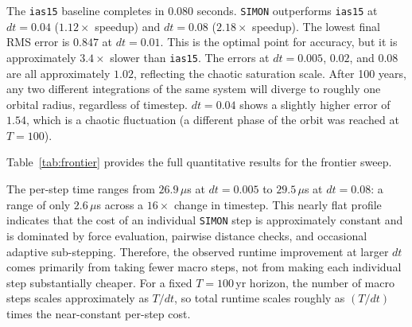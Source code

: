 \documentclass[12pt]{article}
\begin{document}
The \texttt{ias15} baseline completes in $0.080$ seconds. \texttt{SIMON} outperforms
\texttt{ias15} at $dt = 0.04$ ($1.12\times$ speedup) and $dt = 0.08$ ($2.18\times$
speedup). The lowest final RMS error is $0.847$ at $dt = 0.01$. This is the optimal
point for accuracy, but it is approximately $3.4\times$ slower than \texttt{ias15}.
The errors at $dt = 0.005$, $0.02$, and $0.08$ are all approximately $1.02$,
reflecting the chaotic saturation scale. After 100 years, any two different integrations
of the same system will diverge to roughly one orbital radius, regardless of timestep.
$dt = 0.04$ shows a slightly higher error of $1.54$, which is a chaotic fluctuation
(a different phase of the orbit was reached at $T = 100$).

Table~\ref{tab:frontier} provides the full quantitative results for the frontier sweep.

\begin{table}[H]
\centering
\caption{Speed-accuracy frontier results for \texttt{SIMON} with adaptive
sub-stepping, $T = 100$\,yr. \texttt{ias15} baseline: $0.080$\,s total,
$\lambda = 0.1655$\,yr$^{-1}$ at $dt = 0.04$\,yr. Bold row = operational timestep.}
\label{tab:frontier}
\end{table}

The per-step time ranges from $26.9\,\mu$s at $dt = 0.005$ to $29.5\,\mu$s at
$dt = 0.08$: a range of only $2.6\,\mu$s across a $16\times$ change in timestep.
This nearly flat profile indicates that the cost of an individual \texttt{SIMON}
step is approximately constant and is dominated by force evaluation, pairwise
distance checks, and occasional adaptive sub-stepping. Therefore, the observed
runtime improvement at larger $dt$ comes primarily from taking fewer macro steps,
not from making each individual step substantially cheaper. For a fixed
$T = 100$\,yr horizon, the number of macro steps scales approximately as $T/dt$,
so total runtime scales roughly as $(T/dt)$ times the near-constant per-step cost.
\end{document}
